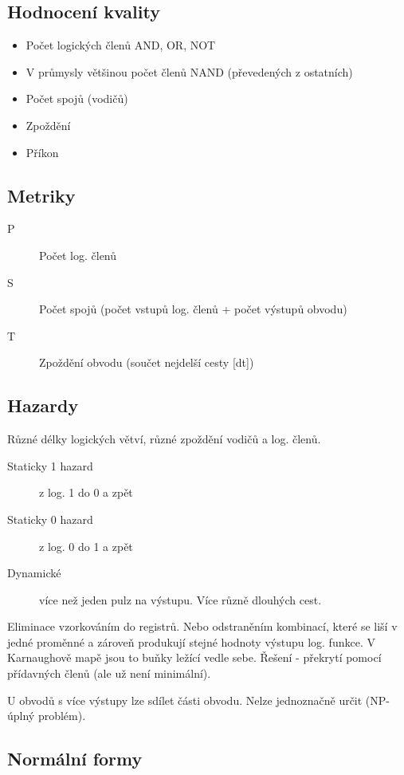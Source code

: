 \documentclass[a4paper, 11pt]{report}
\begin{document}
\subsection{Hodnocení kvality}
\begin{itemize}
	\item Počet logických členů AND, OR, NOT
	\item V průmysly většinou počet členů NAND (převedených z ostatních)
	\item Počet spojů (vodičů)
	\item Zpoždění
	\item Příkon
\end{itemize}

\subsection{Metriky}
\begin{description}
	\item[P] Počet log. členů
	\item[S] Počet spojů (počet vstupů log. členů + počet výstupů obvodu)
	\item[T] Zpoždění obvodu (součet nejdelší cesty [dt])
\end{description}

\subsection{Hazardy}
Různé délky logických větví, různé zpoždění vodičů a log. členů.

\begin{description}
	\item[Staticky 1 hazard] z log. 1 do 0 a zpět
	\item[Staticky 0 hazard] z log. 0 do 1 a zpět
	\item[Dynamické] více než jeden pulz na výstupu. Více různě dlouhých cest.
\end{description}

Eliminace vzorkováním do registrů. Nebo odstraněním kombinací, které se liší v jedné proměnné a zároveň produkují stejné hodnoty výstupu log. funkce. V Karnaughově mapě jsou to buňky ležící vedle sebe. Řešení - překrytí pomocí přídavných členů (ale už není minimální).

U obvodů s více výstupy lze sdílet části obvodu. Nelze jednoznačně určit (NP-úplný problém).

\subsection{Normální formy}
\end{document}
